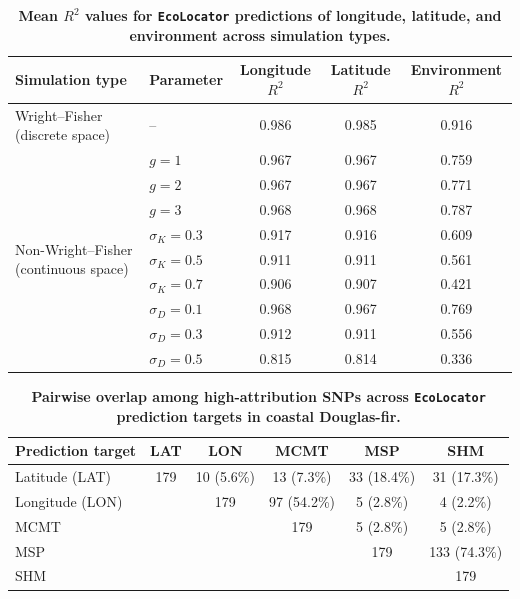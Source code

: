 \documentclass[]{article}
\newcommand{\dfir}{Douglas-fir\xspace}
\newcommand{\ecolocator}{\texttt{EcoLocator}\xspace}
\begin{document}
\begin{table}[ht]
  \centering
  \caption{\textbf{Mean $R^2$ values for \ecolocator predictions of longitude, latitude, and environment across simulation types.}}
  \label{tab:supptable2}
  \begin{tabular}{@{}llccc@{}}
  \hline
  \textbf{Simulation type} & \textbf{Parameter} & \textbf{Longitude $R^2$} & \textbf{Latitude $R^2$} & \textbf{Environment $R^2$} \\
  \hline
  Wright--Fisher (discrete space) & -- & 0.986 & 0.985 & 0.916 \\
  \hline
  \multirow{9}{*}{Non-Wright--Fisher (continuous space)}
   & $g=1$ & 0.967 & 0.967 & 0.759 \\
   & $g=2$ & 0.967 & 0.967 & 0.771 \\
   & $g=3$ & 0.968 & 0.968 & 0.787 \\
   \cline{2-5}
   & $\sigma_K=0.3$ & 0.917 & 0.916 & 0.609 \\
   & $\sigma_K=0.5$ & 0.911 & 0.911 & 0.561 \\
   & $\sigma_K=0.7$ & 0.906 & 0.907 & 0.421 \\
   \cline{2-5}
   & $\sigma_D=0.1$ & 0.968 & 0.967 & 0.769 \\
   & $\sigma_D=0.3$ & 0.912 & 0.911 & 0.556 \\
   & $\sigma_D=0.5$ & 0.815 & 0.814 & 0.336 \\
  \hline
  \end{tabular}
\end{table}

\begin{table}[ht]
  \centering
  \caption{\textbf{Pairwise overlap among high-attribution SNPs across 
  \ecolocator prediction targets in coastal \dfir.}}
  \label{tab:dfir-shap-overlap}
  \begin{tabular}{@{}lccccc@{}}
  \hline
  \textbf{Prediction target} & \textbf{LAT} & \textbf{LON} & \textbf{MCMT} & \textbf{MSP} & \textbf{SHM} \\
  \hline
  Latitude (LAT)  & 179 & 10 (5.6\%) & 13 (7.3\%) & 33 (18.4\%) & 31 (17.3\%) \\
  Longitude (LON) &     & 179        & 97 (54.2\%) & 5 (2.8\%) & 4 (2.2\%) \\
  MCMT            &     &            & 179         & 5 (2.8\%) & 5 (2.8\%) \\
  MSP             &     &            &             & 179       & 133 (74.3\%) \\
  SHM             &     &            &             &           & 179 \\
  \hline
  \end{tabular}
\end{table}
\end{document}
